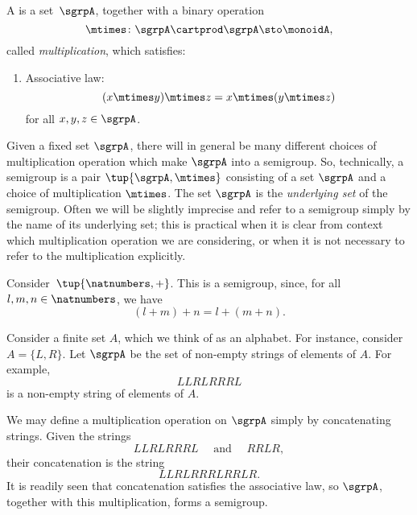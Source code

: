 

\section{}\label{sec:semigroups}


\begin{definition}[Semigroup]
  \label{def:semigroup}
  A \emph{} is a set~$\sgrpA$, together with a binary operation~
  \begin{equation}
    \mtimes \colon \sgrpA \cartprod \sgrpA \sto \monoidA,
  \end{equation}
  called \emph{multiplication}, which satisfies:
  \begin{enumerate}
    \item Associative law:
    \begin{equation}
      \label{eq:semigroup-associative}
      (x\mtimes y) \mtimes z
      = x\mtimes (y\mtimes z)
    \end{equation}
    for all $x , y, z \in \sgrpA$.
  \end{enumerate}
\end{definition}

\begin{remark}
  Given a fixed set $\sgrpA$, there will in general be many different choices of multiplication operation which make $\sgrpA$ into a semigroup.
So, technically, a semigroup is a pair $\tup{\sgrpA, \mtimes}$ consisting of a set $\sgrpA$ and a choice of multiplication $\mtimes$.
The set $\sgrpA$ is the \emph{underlying set} of the semigroup.
Often we will be slightly imprecise and refer to a semigroup simply by the name of its underlying set; this is practical when it is clear from context which multiplication operation we are considering, or when it is not necessary to refer to the multiplication explicitly.
\end{remark}

\begin{example}
\label{natnum-semigroup}
Consider~$\tup{\natnumbers,+}$. This is a semigroup, since, for all~$l,m, n \in \natnumbers$, we have
\begin{equation*}
(l+m) +n
=l+(m+n).
\end{equation*}
\end{example}

\begin{example}
\label{string-semigroup}
Consider a finite set $A$, which we think of as an alphabet. For instance, consider $A = \{ L, R \}$.
Let $\sgrpA$ be the set of non-empty strings of elements of $A$. For example,
$$ LLRLRRRL $$
is a non-empty string of elements of $A$.

We may define a multiplication operation on $\sgrpA$ simply by concatenating strings. Given the strings
$$ LLRLRRRL  \quad \text{ and } \quad RRLR, $$
their concatenation is the string
$$ LLRLRRRLRRLR.$$
It is readily seen that concatenation satisfies the associative law, so $\sgrpA$, together with this multiplication, forms a semigroup.
\end{example}





